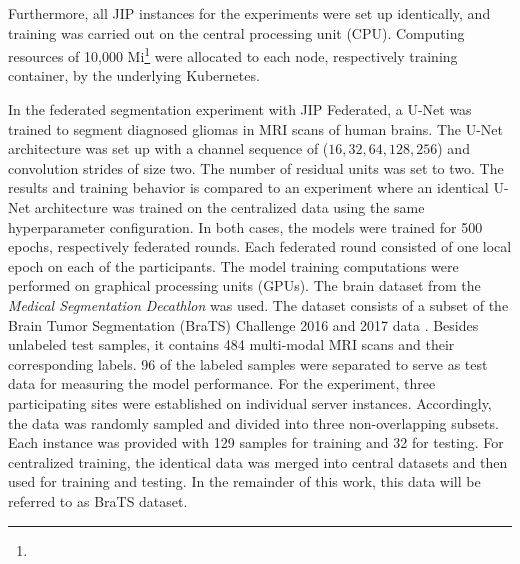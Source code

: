 Furthermore, all JIP instances for the experiments were set up identically, and training was carried out on the central processing unit (CPU). Computing resources of 10,000 Mi\footnote{} were allocated to each node, respectively training container, by the underlying Kubernetes.



In the federated segmentation experiment with JIP Federated, a U-Net \citep{Ronneberger2015U-net:Segmentation} was trained to segment diagnosed gliomas in MRI scans of human brains. The U-Net architecture was set up with a channel sequence of ($16, 32, 64, 128, 256$) and convolution strides of size two. The number of residual units was set to two.
The results and training behavior is compared to an experiment where an identical U-Net architecture was trained on the centralized data using the same hyperparameter configuration.
In both cases, the models were trained for 500 epochs, respectively federated rounds. Each federated round consisted of one local epoch on each of the participants.
The model training computations were performed on graphical processing units (GPUs).
The brain dataset from the \textit{Medical Segmentation Decathlon} was used. The dataset consists of a subset of the Brain Tumor Segmentation (BraTS) \cite{Menze2015TheBRATS} Challenge 2016 and 2017 data \citep{Antonelli2021TheDecathlon}. Besides unlabeled test samples, it contains 484 multi-modal MRI scans and their corresponding labels. 96 of the labeled samples were separated to serve as test data for measuring the model performance. For the experiment, three participating sites were established on individual server instances. Accordingly, the data was randomly sampled and divided into three non-overlapping subsets. Each instance was provided with 129 samples for training and 32 for testing. For centralized training, the identical data was merged into central datasets and then used for training and testing.
In the remainder of this work, this data will be referred to as BraTS dataset.

